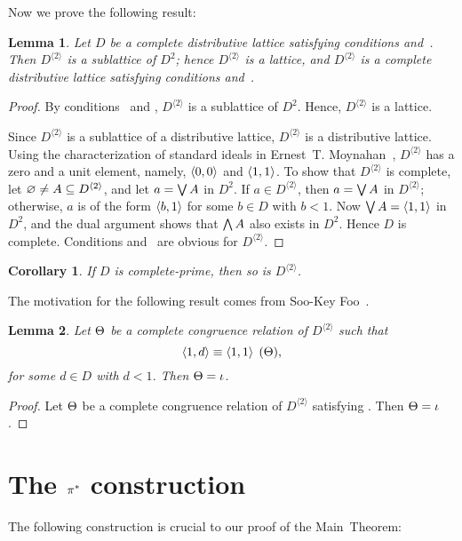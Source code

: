 \documentclass{amsart}
\theoremstyle{plain}
\newtheorem{corollary}{Corollary}
\newtheorem{lemma}{Lemma}
\theoremstyle{definition}
\theoremstyle{remark}
\numberwithin{equation}{section}
\newcommand{\Dsq}{D^{\langle2\rangle}}
\begin{document}
Now we prove the following result:

\begin{lemma}\label{L:Dsq} 
   Let $D$ be a complete distributive lattice satisfying 
   conditions  and~. 
   Then $\Dsq$ is a sublattice of $D^{2}$; hence $\Dsq$ is
   a lattice, and $\Dsq$ is a complete distributive lattice 
   satisfying conditions  and~. 
\end{lemma}

\begin{proof}
   By conditions~ and , $\Dsq$ is a 
   sublattice of $D^{2}$. Hence, $\Dsq$ is a lattice.

   Since $\Dsq$ is a sublattice of a distributive lattice, 
   $\Dsq$ is a distributive lattice. Using the characterization 
   of standard ideals in Ernest~T. Moynahan~\cite{eM57}, 
   $\Dsq$ has a zero and a unit element, namely, 
   $\vect<0, 0>$ and $\vect<1, 1>$. To show that $\Dsq$ is
   complete, let $\empset \ne A \contd \Dsq$, and let $a = \bigvee A$
   in $D^{2}$. If $a \in \Dsq$, then 
   $a = \bigvee A$ in $\Dsq$; otherwise, $a$ is of the form 
   $\vect<b, 1>$ for some $b \in D$ with $b < 1$. Now 
   $\JJ A = \vect<1, 1>$ in $D^{2}$, and   
   the dual argument shows that $\bigwedge A$ also exists in 
   $D^{2}$. Hence $D$ is complete. Conditions  
   and~ are obvious for $\Dsq$. 
\end{proof}
\begin{corollary}\label{C:prime}
   If $D$ is complete-prime, then so is $\Dsq$.
\end{corollary}

The motivation for the following result comes from Soo-Key 
Foo~\cite{sF90}.

\begin{lemma}\label{L:ccr} 
   Let $\Theta$ be a complete congruence relation of $\Dsq$ such 
   that
   \begin{equation}\label{E:rigid}
      \congr \vect<1, d>=\vect<1, 1>(\GrQ),
   \end{equation}
   for some $d \in D$ with $d < 1$. Then $\Theta = \iota$.
\end{lemma}

\begin{proof}
   Let $\Theta$ be a complete congruence relation of $\Dsq$ 
   satisfying . Then $\Theta = \iota$.
\end{proof}

\section{The $\pi^{*}$ construction}\label{S:P*} 
The following construction is crucial to our proof of the 
Main~Theorem:
\end{document}
